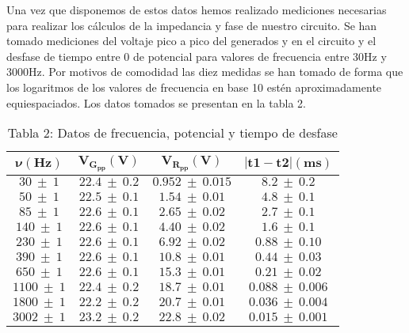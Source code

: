 \documentclass[article, 11pt]{report}
\begin{document}
Una vez que disponemos de estos datos hemos realizado mediciones necesarias para realizar los cálculos de la impedancia y fase de nuestro circuito. Se han tomado mediciones del voltaje pico a pico del generados y en el circuito y el desfase de tiempo entre 0 de potencial para valores de frecuencia entre 30Hz y 3000Hz. Por motivos de comodidad las diez medidas se han tomado de forma que los logaritmos de los valores de frecuencia en base 10 estén aproximadamente equiespaciados. Los datos tomados se presentan en la tabla 2.


\begin{table}[H]
	\begin{center}
		\begin{tabular}{| c | c  | c | c | }
			\hline 
			$\mathbf{\nu(Hz)}$ & $\mathbf{V_{G_{pp}}(V)}$ & $\mathbf{V_{R_{pp}}(V)}$ & $\mathbf{|t1-t2| (ms)}$ \\
			\hline

			
			$30~ \pm ~ 1$ & $ 22.4 ~ \pm ~ 0.2$ & $0.952 ~ \pm ~ 0.015$ & $8.2 ~ \pm ~ 0.2$ \\
			
			$50 ~ \pm ~ 1$ & $22.5~ \pm ~ 0.1$ & $1.54 ~ \pm ~ 0.01$ &  $4.8 ~ \pm ~ 0.1$  \\
			
			$85~ \pm ~ 1$ & $22.6 ~ \pm ~ 0.1$ & $2.65 ~ \pm ~ 0.02$ &  $2.7 ~ \pm ~ 0.1$  \\
			
			$140 ~ \pm ~ 1$ & $22.6 ~ \pm ~ 0.1$ & $4.40 ~ \pm ~ 0.02$ & $1.6 ~ \pm ~ 0.1$  \\
			
			$230 ~ \pm ~ 1$ & $22.6 ~ \pm ~ 0.1$ & $6.92 ~ \pm ~ 0.02$ & $0.88 ~ \pm ~ 0.10$  \\
			
			$390 ~ \pm ~ 1$ & $22.6 ~ \pm ~ 0.1$ & $10.8 ~ \pm ~ 0.01$ & $0.44 ~ \pm ~ 0.03$  \\
			
			$650 ~ \pm ~ 1$ & $22.6 ~ \pm ~ 0.1$ & $15.3 ~ \pm ~ 0.01$ & $0.21 ~ \pm ~ 0.02$  \\
			
			$1100 ~ \pm ~ 1$ & $22.4 ~ \pm ~ 0.2$ & $18.7 ~ \pm ~ 0.01$ & $0.088 ~ \pm ~ 0.006$  \\
			
			$1800 ~ \pm ~1$ & $22.2 ~ \pm ~ 0.2$ & $20.7 ~ \pm ~ 0.01$ & $0.036 ~ \pm ~ 0.004$  \\
			
			$3002~ \pm ~ 1$ & $23.2 ~ \pm ~ 0.2$ & $22.8 ~ \pm ~ 0.02$ & $0.015 ~ \pm ~ 0.001$ \\
			
		
			\hline
			
		\end{tabular}
		\label{Tab:3}
		\caption*{Tabla 2: Datos  de frecuencia, potencial y tiempo de desfase  }
	\end{center}
\end{table}
\end{document}
